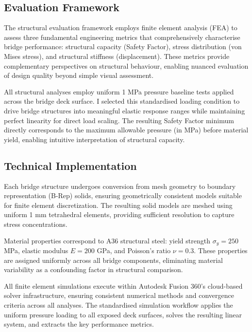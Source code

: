 \subsection{Evaluation Framework}

The structural evaluation framework employs finite element analysis (FEA) to assess three fundamental engineering metrics that comprehensively characterise bridge performance: structural capacity (Safety Factor), stress distribution (von Mises stress), and structural stiffness (displacement). These metrics provide complementary perspectives on structural behaviour, enabling nuanced evaluation of design quality beyond simple visual assessment.

All structural analyses employ uniform 1 MPa pressure baseline tests applied across the bridge deck surface. I selected this standardised loading condition to drive bridge structures into meaningful elastic response ranges while maintaining perfect linearity for direct load scaling. The resulting Safety Factor minimum directly corresponds to the maximum allowable pressure (in MPa) before material yield, enabling intuitive interpretation of structural capacity.

\subsection{Technical Implementation}

Each bridge structure undergoes conversion from mesh geometry to boundary representation (B-Rep) solids, ensuring geometrically consistent models suitable for finite element discretization. The resulting solid models are meshed using uniform 1 mm tetrahedral elements, providing sufficient resolution to capture stress concentrations.

Material properties correspond to A36 structural steel: yield strength $\sigma_y = 250$ MPa, elastic modulus $E = 200$ GPa, and Poisson's ratio $\nu = 0.3$. These properties are assigned uniformly across all bridge components, eliminating material variability as a confounding factor in structural comparison.

All finite element simulations execute within Autodesk Fusion 360's cloud-based solver infrastructure, ensuring consistent numerical methods and convergence criteria across all analyses. The standardised simulation workflow applies the uniform pressure loading to all exposed deck surfaces, solves the resulting linear system, and extracts the key performance metrics.

